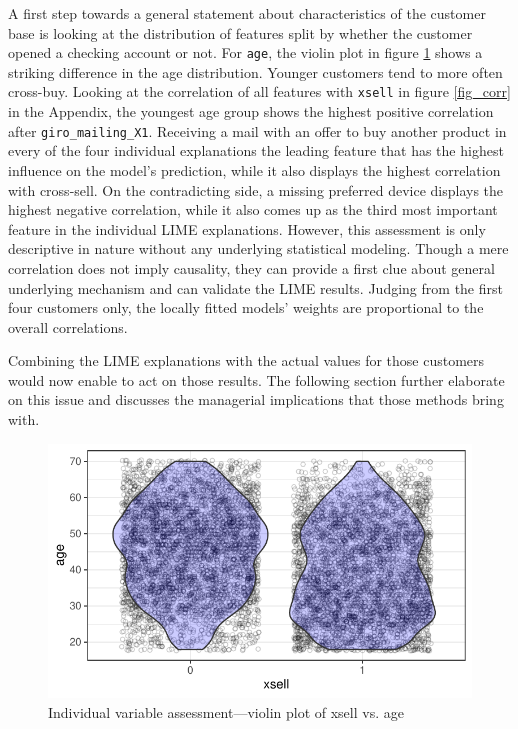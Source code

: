 \documentclass[12pt,a4paper]{article}
\let\code=\texttt
\begin{document}
A first step towards a general statement about characteristics of the customer base is looking at the distribution of features split by whether the customer
opened a checking account or not.
For \code{age}, the violin plot in figure \ref{fig_violin_age} shows a striking difference in the age distribution.
Younger customers tend to more often cross-buy.
Looking at the correlation of all features with \code{xsell} in figure \ref{fig_corr} in the Appendix, the youngest age group shows the highest positive correlation after \code{giro\_mailing\_X1}.
Receiving a mail with an offer to buy another product in every of the four individual explanations the leading feature that has the highest influence on
the model's prediction, while it also displays the highest correlation with cross-sell.
On the contradicting side, a missing preferred device displays the highest negative correlation,
while it also comes up as the third most important feature in the individual LIME explanations.
However, this assessment is only descriptive in nature without any underlying statistical modeling.
Though a mere correlation does not imply causality, they can provide a first clue about general underlying mechanism and can validate the LIME results.
Judging from the first four customers only, the locally fitted models' weights are proportional to the overall correlations.

Combining the LIME explanations with the actual values for those customers would now enable to act on those results.
The following section further elaborate on this issue and discusses the managerial implications that those methods bring with.

\begin{figure}[ht]
	\centering
  \includegraphics[scale=0.83]{figures/violin_age_xsell.pdf}
	\caption{Individual variable assessment---violin plot of xsell vs. age}
	\label{fig_violin_age}
\end{figure}
\end{document}
